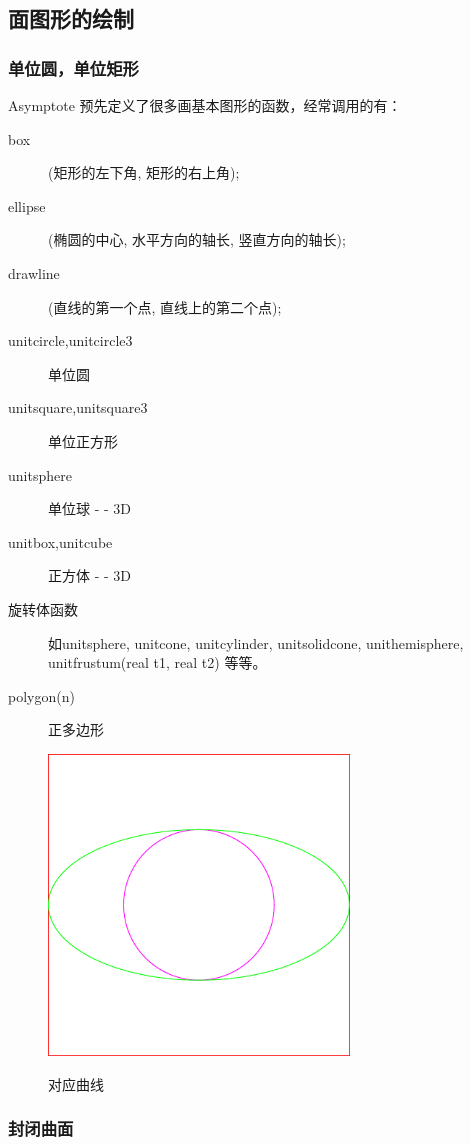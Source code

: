 \subsection{面图形的绘制}

\subsubsection{单位圆，单位矩形}
Asymptote 预先定义了很多画基本图形的函数，经常调用的有：\\
\begin{description}
  \item[box] (矩形的左下角, 矩形的右上角);
  \item[ellipse] (椭圆的中心, 水平方向的轴长, 竖直方向的轴长);
  \item[drawline] (直线的第一个点, 直线上的第二个点);
  \item[unitcircle,unitcircle3] 单位圆
  \item[unitsquare,unitsquare3] 单位正方形
  \item[unitsphere] 单位球 - - 3D
  \item[unitbox,unitcube] 正方体 - - 3D
  \item[旋转体函数] 如unitsphere, unitcone, unitcylinder, unitsolidcone,%
  unithemisphere, unitfrustum(real t1, real t2) 等等。
  \item[polygon(n)] 正多边形

\end{description}

  


\begin{figure}[htbp]
  \centering
  \includegraphics[width=8cm]{body/asycode/surface.pdf}\\
  \caption{对应曲线}\label{surface}
\end{figure}

\subsubsection{封闭曲面}
\clearpage
